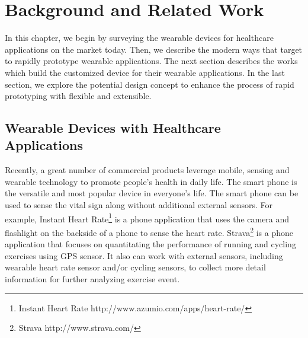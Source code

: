 \chapter{Background and Related Work}

In this chapter, we begin by surveying the wearable devices for healthcare applications on the market today. Then, we describe the modern ways that target to rapidly prototype wearable applications. The next section describes the works which build the customized device for their wearable applications. In the last section, we explore the potential design concept to enhance the process of rapid prototyping with flexible and extensible. 

\section{Wearable Devices with Healthcare Applications}
Recently, a great number of commercial products leverage mobile, sensing and wearable technology to promote people's health in daily life. The smart phone is the versatile and most popular device in everyone's life. The smart phone can be used to sense the vital sign along without additional external sensors. For example, Instant Heart Rate\footnote{Instant Heart Rate 
\hspace{1cm} http://www.azumio.com/apps/heart-rate/} is a phone application that uses the camera and flashlight on the backside of a phone to sense the heart rate. Strava\footnote{Strava
\hspace{1cm} http://www.strava.com/} is a phone application that focuses on quantitating the performance of running and cycling exercises using GPS sensor. It also can work with external sensors, including wearable heart rate sensor and/or cycling sensors, to collect more detail information for further analyzing exercise event. 


